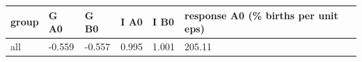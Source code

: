 \begingroup\small
\setlength{\tabcolsep}{3pt}
\renewcommand{\arraystretch}{1.04}
\begin{tabularx}{\linewidth}{XXXXXX}
\toprule
group & G A0 & G B0 & I A0 & I B0 & response A0 (\% births per unit eps) \\
\midrule
all & -0.559 & -0.557 & 0.995 & 1.001 & 205.11 \\
\bottomrule
\end{tabularx}
\endgroup
